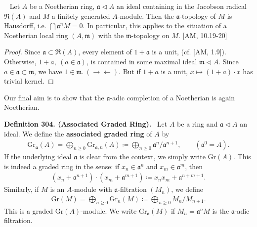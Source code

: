 \documentclass[12pt,a4paper,footinclude=true,headinclude=true]{scrbook} %
\newenvironment{corollary}[2][]
{\renewcommand\theinnercustomcol{#2}\innercustomcol[#1]
\begin{mdframed}[backgroundcolor=gray!20]\ }
{\end{mdframed}\endinnercustomcol}
\newenvironment{definition}[2][Definition]
    { \begin{mdframed}[backgroundcolor=gray!20] \textbf{#1 #2.}\ }
    {  \end{mdframed}}
\begin{document}
\begin{corollary}{303}
    Let $A$ be a Noetherian ring, $\mathfrak{a}\triangleleft A$ an ideal containing in the Jacobson radical $\mathfrak{R}(A)$ and $M$ a finitely generated $A$-module. Then the $\mathfrak{a}$-topology of $M$ is Hausdorff, i.e. $\bigcap\mathfrak{a}^nM=0$. In particular, this applies to the situation of a Noetherian local ring $(A,\mathfrak{m})$ with the $\mathfrak{m}$-topology on $M$. [AM, 10.19-20]
\end{corollary}
\begin{proof}
    Since $\mathfrak{a}\subset\mathfrak{R}(A)$, every element of $1+\mathfrak{a}$ is a unit, (cf. [AM, 1.9]). Otherwise, $1+a,\ (a\in\mathfrak{a})$, is contained in some maximal ideal $\mathfrak{m}\triangleleft A$. Since $a\in\mathfrak{a}\subset\mathfrak{m}$, we have $1\in\mathfrak{m}.\ (\to\gets)$. But if $1+a$ is a unit, $x\mapsto(1+a)\cdot x$ has trivial kernel.
\end{proof}

Our final aim is to show that the $\mathfrak{a}$-adic completion of a Noetherian is again Noetherian.
\begin{definition}{304. (Associated Graded Ring)}
    \newline Let $A$ be a ring and $\mathfrak{a}\triangleleft A$ an ideal. We define the \textbf{associated graded ring} of $A$ by
    \begin{align*}
        \mathrm{Gr}_\mathfrak{a}(A)=\bigoplus_{n\geq0}\mathrm{Gr}_{\mathfrak{a},n}(A)\coloneqq\bigoplus_{n\geq0}\mathfrak{a}^n/\mathfrak{a}^{n+1},\qquad(\mathfrak{a}^0=A).
    \end{align*}
    If the underlying ideal $\mathfrak{a}$ is clear from the context, we simply write $\mathrm{Gr}(A)$. This is indeed a graded ring in the sense: if $x_n\in\mathfrak{a}^n$ and $x_m\in\mathfrak{a}^m$, then
    \begin{align*}
        (x_n+\mathfrak{a}^{n+1})\cdot(x_m+\mathfrak{a}^{m+1})\coloneqq x_nx_m+\mathfrak{a}^{n+m+1}.
    \end{align*}
    Similarly, if $M$ is an $A$-module with $\mathfrak{a}$-filtration $(M_n)$, we define
    \begin{align*}
        \mathrm{Gr}(M)=\bigoplus_{n\geq0}\mathrm{Gr}_n(M)\coloneqq\bigoplus_{n\geq0}M_n/M_{n+1}.
    \end{align*}
    This is a graded $\mathrm{Gr}(A)$-module. We write $\mathrm{Gr}_\mathfrak{a}(M)$ if $M_n=\mathfrak{a}^nM$ is the $\mathfrak{a}$-adic filtration.
\end{definition}
\end{document}
